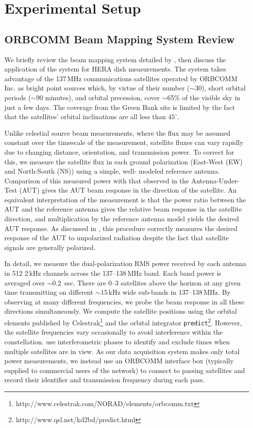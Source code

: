 \section{Experimental Setup}

\subsection{ORBCOMM Beam Mapping System Review}
\label{sec:orbcommreview}

We briefly review the beam mapping system detailed by \citet{neben15}, then discuss the 
application of the system for HERA dish measurements. The system 
takes advantage of the 137\,MHz communications satellites operated by ORBCOMM Inc. 
as bright point sources which, by virtue of their number ($\sim30$), short orbital periods 
($\sim90$ minutes), and orbital precession, cover $\sim$65\% of the visible sky in just a few 
days. The coverage from the Green Bank site is limited by the fact that the satellites' orbital inclinations are all less 
than $45^\circ$. 

Unlike celestial source beam measurements, where the flux may be 
assumed constant over the timescale of the measurement, satellite fluxes can vary rapidly 
due to changing distance, orientation, and transmission power. To correct for this, we 
measure the satellite flux in each ground polarization (East-West (EW) and North-South (NS)) using a simple, well-
modeled reference antenna. Comparison of this measured power with that observed in the 
Antenna-Under-Test (AUT) gives the AUT beam response in the direction of the satellite. 
An equivalent interpretation of the measurement is that the power ratio between the AUT and the reference 
antenna gives the relative beam response in the satellite direction, and multiplication by 
the reference antenna model yields the desired AUT response. As discussed in 
\citet{neben15}, this procedure correctly measures the desired response of the AUT to unpolarized radiation despite the fact that satellite signals are generally polarized.

In detail, we measure the dual-polarization RMS power received by each antenna in 512 2\,kHz 
channels across the 137--138\,MHz band. Each band power is averaged over $\sim0.2$
\,sec. There are 0--3 satellites above the horizon at any given time transmitting on different 
$\sim15$\,kHz wide sub-bands in 137--138\,MHz. By observing at many different 
frequencies, we probe the beam response in all these directions simultaneously. We 
compute the satellite positions using the orbital elements published by Celestrak\footnote{http://www.celestrak.com/NORAD/elements/orbcomm.txt} and the orbital 
integrator \texttt{predict}\footnote{http://www.qsl.net/kd2bd/predict.html}. However, the 
satellite frequencies vary occasionally to avoid interference within the constellation. 
\citet{zheng14} use interferometric phases to identify and exclude times when multiple 
satellites are in view. As our data acquisition system makes only total power 
measurements, we instead use an ORBCOMM interface box (typically supplied to 
commercial users of the network) to connect to passing satellites and record their identifier 
and transmission frequency during each pass.


